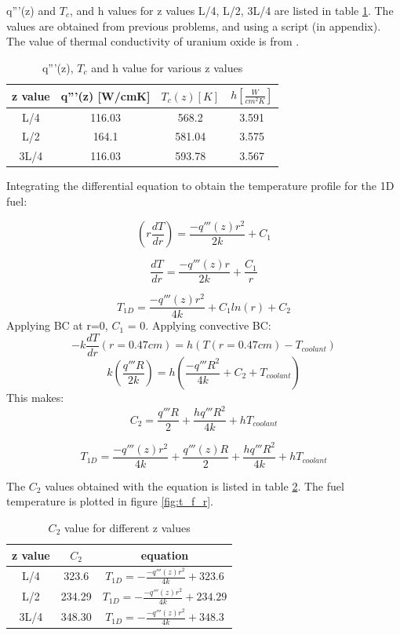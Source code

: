 \documentclass[12pt,letterpaper]{article}
\begin{document}
q'''(z) and $T_c$, and h  values for z values L/4, L/2, 3L/4 are listed in table \ref{tab:q_vol}.
The values are obtained from previous problems, and using a script (in appendix).
The value of thermal conductivity of uranium oxide is from \cite{ronchi_thermal_1999}.

\begin{table}[h]
     \centering
    \begin{tabular}{cccc}
       \hline
       z value & q'''(z) [W/cmK] & $T_c(z) [K]$ & $h [\frac{W}{cm^2 K}] $ \\
       \hline
       L/4 & 116.03 & 568.2 & 3.591 \\
       L/2 & 164.1 & 581.04 & 3.575 \\
       3L/4 & 116.03 & 593.78 & 3.567 \\
       \hline
    \end{tabular}
    \caption {q'''(z), $T_c$ and h value for various z values}
    \label{tab:q_vol}
\end{table}

Integrating the differential equation to obtain the temperature profile for the
1D fuel:


\[ (r \frac{dT}{dr}) = \frac{-q'''(z)r^2}{2k} + C_1 \]

\[ \frac{dT}{dr} = \frac{-q'''(z)r}{2k} + \frac{C_1}{r} \]

\[ T_{1D} = \frac{-q'''(z)r^2}{4k} + C_1 ln(r) + C_2 \]
Applying BC at r=0, $C_1$ = 0.
Applying convective BC:
\[ -k \frac{dT}{dr}(r= 0.47 cm) = h (T(r = 0.47 cm ) - T_{coolant})\]
\[ k( \frac{q'''R}{2k}) = h (\frac{-q'''R^2}{4k} + C_2 + T_{coolant})\]
This makes:
\[C_2 = \frac{q'''R}{2} + \frac{hq'''R^2}{4k} + hT_{coolant}\]

\[ T_{1D} = \frac{-q'''(z)r^2}{4k} + \frac{q'''(z)R}{2} + \frac{hq'''R^2}{4k} + hT_{coolant}\]


The $C_2$ values obtained with the equation is listed in table \ref{tab:c2}.
The fuel temperature is plotted in figure \ref{fig:t_f_r}.

\begin{table}[h]
     \centering
    \begin{tabular}{ccc}
       \hline
       z value & $C_2$ & equation \\
       \hline
       L/4 & 323.6  & $T_{1D} = -\frac{-q'''(z)r^2}{4k} + 323.6$ \\
       L/2 & 234.29 & $T_{1D} = -\frac{-q'''(z)r^2}{4k} + 234.29$ \\
       3L/4 & 348.30 & $T_{1D} = -\frac{-q'''(z)r^2}{4k} + 348.3$\\
       \hline
    \end{tabular}
    \caption {$C_2$ value for different z values}
    \label{tab:c2}
\end{table}
\end{document}
